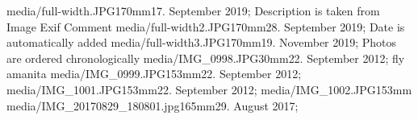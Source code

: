 \photoNouveauN
  {media/full-width.JPG}{170mm}{17. September 2019; Description is taken from Image Exif Comment}
  {}{}{}
\photoNouveauN
  {media/full-width2.JPG}{170mm}{28. September 2019; Date is automatically added}
  {}{}{}
\clearpage  %
\photoNouveauN
  {media/full-width3.JPG}{170mm}{19. November 2019; Photos are ordered chronologically}
  {}{}{}
\photoNouveauN
  {media/IMG_0998.JPG}{30mm}{22. September 2012; fly amanita}
  {}{}{}
\photoNouveauN
  {media/IMG_0999.JPG}{153mm}{22. September 2012; }
  {}{}{}
\clearpage  %
\photoNouveauN
  {media/IMG_1001.JPG}{153mm}{22. September 2012; }
  {}{}{}
\photoNouveauN
  {media/IMG_1002.JPG}{153mm}{}
  {}{}{}
\clearpage  %
\photoNouveauN
  {media/IMG_20170829_180801.jpg}{165mm}{29. August 2017; }
  {}{}{}
